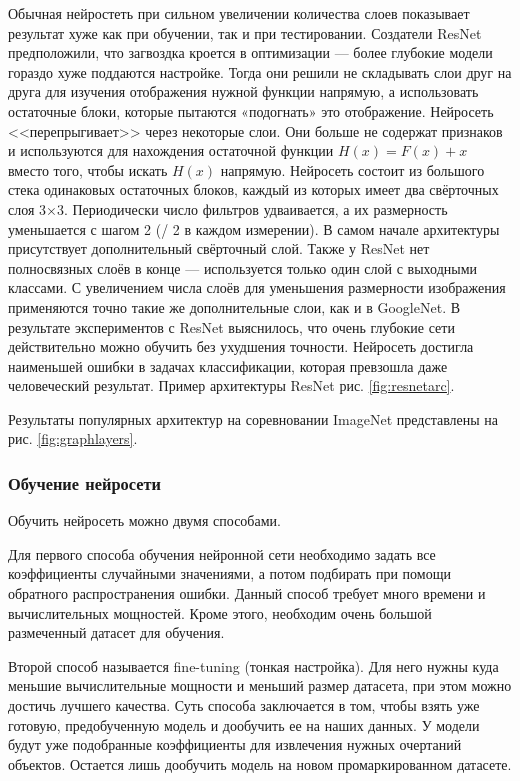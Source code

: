 \documentclass[a4paper,14pt]{article}
\begin{document}
	Обычная нейростеть при сильном увеличении количества слоев показывает результат хуже как при обучении, так и при тестировании.
	Создатели ResNet предположили, что загвоздка кроется в оптимизации — более глубокие модели гораздо хуже поддаются настройке.
	Тогда они решили не складывать слои друг на друга для изучения отображения нужной функции напрямую, а использовать остаточные блоки, которые пытаются «подогнать» это отображение.
	Нейросеть <<перепрыгивает>> через некоторые слои.
	Они больше не содержат признаков и используются для нахождения остаточной функции $H(x) = F(x) + x$ вместо того, чтобы искать $H(x)$ напрямую.
	Нейросеть состоит из большого стека одинаковых остаточных блоков, каждый из которых имеет два свёрточных слоя 3×3.
	Периодически число фильтров удваивается, а их размерность уменьшается с шагом 2 (/ 2 в каждом измерении).
	В самом начале архитектуры присутствует дополнительный свёрточный слой.
	Также у ResNet нет полносвязных слоёв в конце — используется только один слой с выходными классами.
	С увеличением числа слоёв для уменьшения размерности изображения применяются точно такие же дополнительные слои, как и в GoogleNet. 
	В результате экспериментов с ResNet выяснилось, что очень глубокие сети действительно можно обучить без ухудшения точности.
	Нейросеть достигла наименьшей ошибки в задачах классификации, которая превзошла даже человеческий результат.
	Пример архитектуры ResNet рис. \ref{fig:resnetarc}.
	
	Результаты популярных архитектур на соревновании ImageNet представлены на рис. \ref{fig:graphlayers}.
	
	
	\subsubsection{Обучение нейросети}
	
	Обучить нейросеть можно двумя способами.
	
	Для первого способа обучения нейронной сети необходимо задать все коэффициенты случайными значениями, а потом подбирать при помощи обратного распространения ошибки.
	Данный способ требует много времени и вычислительных мощностей.
	Кроме этого, необходим очень большой размеченный датасет для обучения.
	
	Второй способ называется fine-tuning (тонкая настройка).
	Для него нужны куда меньшие вычислительные мощности и меньший размер датасета, при этом можно достичь лучшего качества.
	Суть способа заключается в том, чтобы взять уже готовую, предобученную модель и дообучить ее на наших данных.
	У модели будут уже подобранные коэффициенты для извлечения нужных очертаний объектов.
	Остается лишь дообучить модель на новом промаркированном датасете.
	
\end{document}
